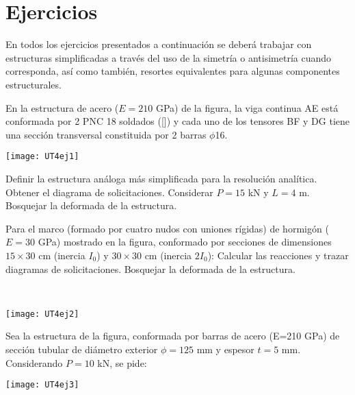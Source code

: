 \section{Ejercicios}
\setcounter{ejercicio}{0}

En todos los ejercicios presentados a continuación se deberá trabajar con estructuras simplificadas a través del uso de la simetría o antisimetría cuando corresponda, así como también, resortes equivalentes para algunas componentes estructurales. %
%

\ejercicio 

En la estructura de acero ($E=210$ GPa) de la figura, la viga continua AE está conformada por 2 PNC 18 soldados ([]) y cada uno de los tensores BF y DG tiene una sección transversal constituida por 2 barras $\phi$16. 

\begin{center}
	\texttt{[image: UT4ej1]}
\end{center}

\parte Definir la estructura análoga más simplificada para la resolución analítica.
\parte Obtener el diagrama de solicitaciones. Considerar $P=15$ kN y $L= 4$ m.
\parte Bosquejar la deformada de la estructura.




\ejercicio

\begin{minipage}[b]{0.58\textwidth}
%
Para el marco (formado por cuatro nudos con uniones rígidas) de hormigón ($E=30$ GPa) mostrado en la figura, conformado por secciones de dimensiones $15 \times 30$ cm (inercia $I_0$) y $30\times 30$ cm (inercia $2 I_0$):
%
\parte Calcular las reacciones y trazar diagramas de solicitaciones.
\parte Bosquejar la deformada de la estructura.
\end{minipage}
~
\begin{minipage}{0.4\textwidth}
\begin{center}
	\texttt{[image: UT4ej2]}
\end{center}
\end{minipage}




\ejercicio

Sea la estructura de la figura, conformada por barras de acero (E=210 GPa) de sección tubular de diámetro exterior $\phi =125$ mm y espesor $t=5$ mm. Considerando $P=10$ kN, se pide:

\begin{center}
	\texttt{[image: UT4ej3]}
\end{center}

